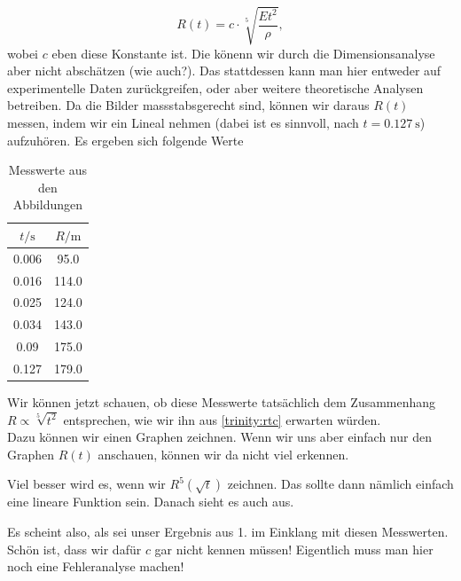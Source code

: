 \begin{Answer}[ref  = trinity]
		\begin{equation}\label{trinity:rtc}
			\boxed{
				R\left(t\right) = c\cdot \sqrt[5]{\frac{Et^2}{\rho}},
				}
		\end{equation}
		wobei $c$ eben diese Konstante ist. Die könenn wir durch die Dimensionsanalyse aber nicht abschätzen (wie auch?). Das stattdessen kann man hier entweder auf experimentelle Daten zurückgreifen, oder aber weitere theoretische Analysen betreiben.
	\Question Da die Bilder massstabsgerecht sind, können wir daraus $R\left(t\right)$ messen, indem wir ein Lineal nehmen (dabei ist es sinnvoll, nach $t=0.127~\mathrm{s}$) aufzuhören. Es ergeben sich folgende Werte
	\begin{table}[h]
		\centering
	\begin{tabular}{|c|c|}
		\hline
	$t/\mathrm{s}$	& $R/\mathrm{m}$ \\ 
		\hline \hline 
	0.006	& 95.0 \\ 
		\hline 
	0.016	& 114.0 \\ 
		\hline 
	0.025	& 124.0 \\ 
		\hline 
	0.034	& 143.0 \\ 
		\hline 
	0.09	&  175.0\\ 
		\hline 
	0.127	&  179.0\\ 
		\hline 
	\end{tabular} 
	\caption{Messwerte aus den Abbildungen}
	\label{trinity:t1}
\end{table}
	Wir können jetzt schauen, ob diese Messwerte tatsächlich dem Zusammenhang $R\propto \sqrt[5]{t^2}$ entsprechen, wie wir ihn aus \eqref{trinity:rtc} erwarten würden.\\
	Dazu können wir einen Graphen zeichnen. Wenn wir uns aber einfach nur den Graphen $R\left(t\right)$ anschauen, können wir da nicht viel erkennen.
	
	 Viel besser wird es, wenn wir $R^5\left(\sqrt{t}\right)$ zeichnen. Das sollte dann nämlich einfach eine lineare Funktion sein. Danach sieht es auch aus.
	 
	 Es scheint also, als sei unser Ergebnis aus 1. im Einklang mit diesen Messwerten. Schön ist, dass wir dafür $c$ gar nicht kennen müssen!
	 Eigentlich muss man hier noch eine Fehleranalyse machen!
\end{Answer}
